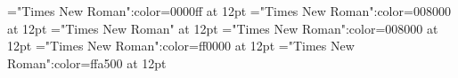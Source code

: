 \documentclass[a4paper]{article}
\begin{document}
 
\pagestyle{plain} 
\font\xitemxitemmain="Times New Roman":color=0000ff at 12pt
\font\xitemenmain="Times New Roman":color=008000 at 12pt
\font\main="Times New Roman" at 12pt
\font\xitemenxitem="Times New Roman":color=008000 at 12pt
\font\xitemmain="Times New Roman":color=ff0000 at 12pt
\font\xitemen="Times New Roman":color=ffa500 at 12pt

\pagestyle{fancy} 








\end{document}
